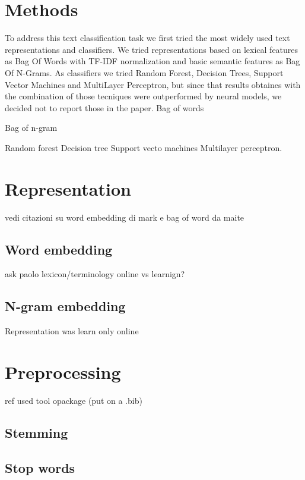 \section{Methods} \label{sec:methods}
To address this text classification task we first tried the most widely used text representations and classifiers.
We tried representations based on lexical features as Bag Of Words \cite{harris1954distributional} with TF-IDF normalization and basic semantic features as Bag Of N-Grams.
As classifiers we tried Random Forest, Decision Trees, Support Vector Machines and MultiLayer Perceptron, but since that results obtaines with the combination of those tecniques were outperformed by neural models, we decided not to report those in the paper.
Bag of words

Bag of n-gram


Random forest
Decision tree
Support vecto machines
Multilayer perceptron.


\section{Representation}

vedi citazioni su word embedding di mark e bag of word da maite


\subsection{Word embedding}

ask paolo lexicon/terminology online vs learnign?


\subsection{N-gram embedding}

Representation was learn only online 


\section{Preprocessing}

ref used tool opackage (put on a .bib)

\subsection{Stemming}

\subsection{Stop words}

